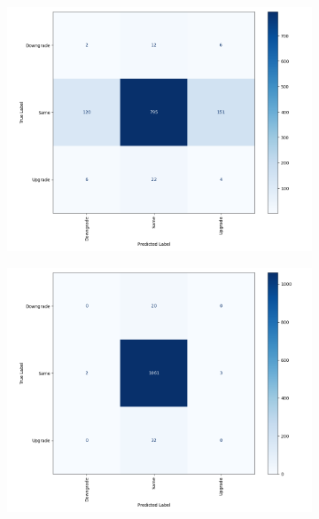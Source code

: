 \documentclass{article}[11pt]
\begin{document}
    \begin{figure}[h!]
        \caption{Rating Changes Confusion Matrices - Most Complex Model}
        \begin{subfigure}[h]{0.4925\textwidth}
            \centering
            \includegraphics[width=0.95\hsize]{../Output/Modelling/Logistic Regression/smote_rating_change_model_3/smote_rating_change_model_3_confusion_matrix_no_title.png}
        \end{subfigure}
        \begin{subfigure}[h]{0.4925\textwidth}
            \centering
            \includegraphics[width=0.95\hsize]{../Output/Modelling/XGBoost/smote_rating_change_model_3/smote_rating_change_model_3_confusion_matrix_no_title.png}
        \end{subfigure}
        \hfill
        \label{fig:change-confusion-matrix}
    \end{figure}
\end{document}
